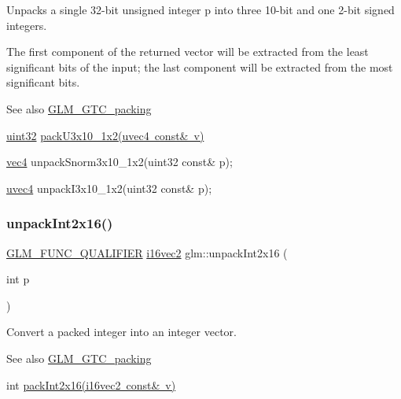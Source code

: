 Unpacks a single 32-\/bit unsigned integer p into three 10-\/bit and one 2-\/bit signed integers.

The first component of the returned vector will be extracted from the least significant bits of the input; the last component will be extracted from the most significant bits.

\begin{DoxySeeAlso}{See also}
\mbox{\hyperlink{group__gtc__packing}{G\+L\+M\+\_\+\+G\+T\+C\+\_\+packing}} 

\mbox{\hyperlink{group__gtc__type__precision_ga202b6a53c105fcb7e531f9b443518451}{uint32}} \mbox{\hyperlink{group__gtc__packing_gaf656d8862628f96b20de7a36eaa1fe56}{pack\+U3x10\+\_\+1x2(uvec4 const\& v)}} 

\mbox{\hyperlink{group__core__types_ga5881b1b022d7fd1b7218f5916532dd02}{vec4}} unpack\+Snorm3x10\+\_\+1x2(uint32 const\& p); 

\mbox{\hyperlink{group__core__types_ga1c426d19627b32b14f0089f7f4ba7b1d}{uvec4}} unpack\+I3x10\+\_\+1x2(uint32 const\& p); 
\end{DoxySeeAlso}
\mbox{\label{group__gtc__packing_ga639c216b452fc364b32c15eb5b8b6a87}} 
\subsubsection{\texorpdfstring{unpack\+Int2x16()}{unpackInt2x16()}}
{\footnotesize\ttfamily \mbox{\hyperlink{setup_8hpp_a33fdea6f91c5f834105f7415e2a64407}{G\+L\+M\+\_\+\+F\+U\+N\+C\+\_\+\+Q\+U\+A\+L\+I\+F\+I\+ER}} \mbox{\hyperlink{group__gtc__type__precision_gad912fd04abb876a5b806118ec6e0f283}{i16vec2}} glm\+::unpack\+Int2x16 (\begin{DoxyParamCaption}\item[{int}]{p }\end{DoxyParamCaption})}

Convert a packed integer into an integer vector.

\begin{DoxySeeAlso}{See also}
\mbox{\hyperlink{group__gtc__packing}{G\+L\+M\+\_\+\+G\+T\+C\+\_\+packing}} 

int \mbox{\hyperlink{group__gtc__packing_ga0182984c14b2b59fd74e72af3f3b4bb9}{pack\+Int2x16(i16vec2 const\& v)}} 
\end{DoxySeeAlso}
\mbox{\label{group__gtc__packing_ga6410b50fa48d15e70b2c34174ee4a3fc}} 
